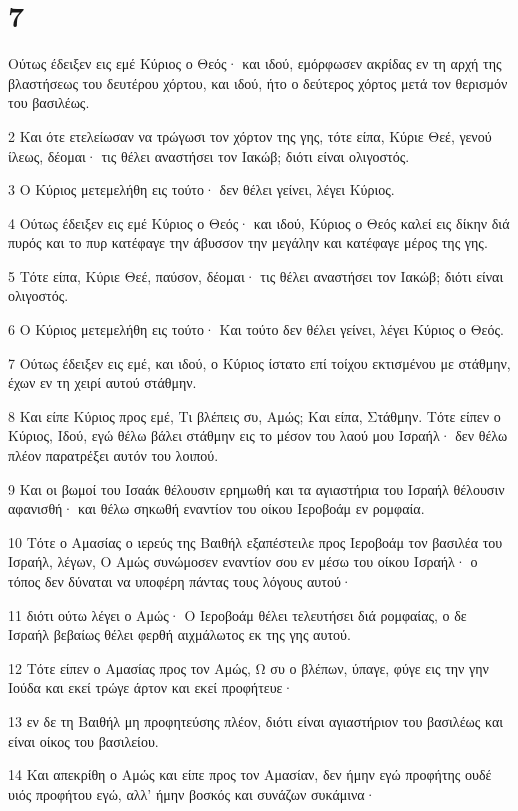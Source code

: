 \chapter{7}

\par Ούτως έδειξεν εις εμέ Κύριος ο Θεός· και ιδού, εμόρφωσεν ακρίδας εν τη αρχή της βλαστήσεως του δευτέρου χόρτου, και ιδού, ήτο ο δεύτερος χόρτος μετά τον θερισμόν του βασιλέως.
\par 2 Και ότε ετελείωσαν να τρώγωσι τον χόρτον της γης, τότε είπα, Κύριε Θεέ, γενού ίλεως, δέομαι· τις θέλει αναστήσει τον Ιακώβ; διότι είναι ολιγοστός.
\par 3 Ο Κύριος μετεμελήθη εις τούτο· δεν θέλει γείνει, λέγει Κύριος.
\par 4 Ούτως έδειξεν εις εμέ Κύριος ο Θεός· και ιδού, Κύριος ο Θεός καλεί εις δίκην διά πυρός και το πυρ κατέφαγε την άβυσσον την μεγάλην και κατέφαγε μέρος της γης.
\par 5 Τότε είπα, Κύριε Θεέ, παύσον, δέομαι· τις θέλει αναστήσει τον Ιακώβ; διότι είναι ολιγοστός.
\par 6 Ο Κύριος μετεμελήθη εις τούτο· Και τούτο δεν θέλει γείνει, λέγει Κύριος ο Θεός.
\par 7 Ούτως έδειξεν εις εμέ, και ιδού, ο Κύριος ίστατο επί τοίχου εκτισμένου με στάθμην, έχων εν τη χειρί αυτού στάθμην.
\par 8 Και είπε Κύριος προς εμέ, Τι βλέπεις συ, Αμώς; Και είπα, Στάθμην. Τότε είπεν ο Κύριος, Ιδού, εγώ θέλω βάλει στάθμην εις το μέσον του λαού μου Ισραήλ· δεν θέλω πλέον παρατρέξει αυτόν του λοιπού.
\par 9 Και οι βωμοί του Ισαάκ θέλουσιν ερημωθή και τα αγιαστήρια του Ισραήλ θέλουσιν αφανισθή· και θέλω σηκωθή εναντίον του οίκου Ιεροβοάμ εν ρομφαία.
\par 10 Τότε ο Αμασίας ο ιερεύς της Βαιθήλ εξαπέστειλε προς Ιεροβοάμ τον βασιλέα του Ισραήλ, λέγων, Ο Αμώς συνώμοσεν εναντίον σου εν μέσω του οίκου Ισραήλ· ο τόπος δεν δύναται να υποφέρη πάντας τους λόγους αυτού·
\par 11 διότι ούτω λέγει ο Αμώς· Ο Ιεροβοάμ θέλει τελευτήσει διά ρομφαίας, ο δε Ισραήλ βεβαίως θέλει φερθή αιχμάλωτος εκ της γης αυτού.
\par 12 Τότε είπεν ο Αμασίας προς τον Αμώς, Ω συ ο βλέπων, ύπαγε, φύγε εις την γην Ιούδα και εκεί τρώγε άρτον και εκεί προφήτευε·
\par 13 εν δε τη Βαιθήλ μη προφητεύσης πλέον, διότι είναι αγιαστήριον του βασιλέως και είναι οίκος του βασιλείου.
\par 14 Και απεκρίθη ο Αμώς και είπε προς τον Αμασίαν, δεν ήμην εγώ προφήτης ουδέ υιός προφήτου εγώ, αλλ' ήμην βοσκός και συνάζων συκάμινα·
